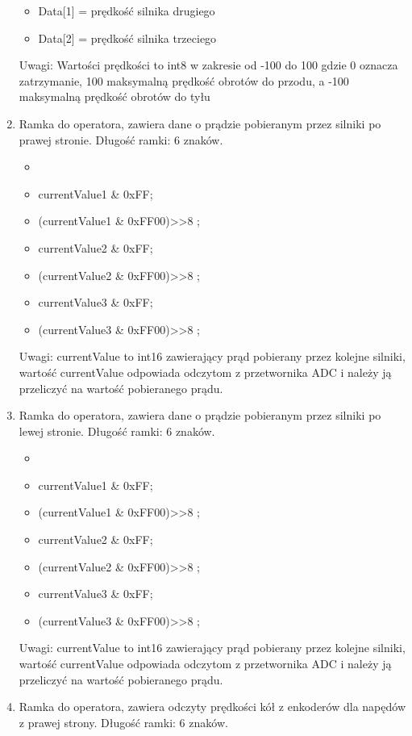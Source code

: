\documentclass{article}
\begin{document}
\begin{enumerate}
\begin{itemize}
  		\item Data[1] = prędkość silnika drugiego
  		\item Data[2] = prędkość silnika trzeciego
  		\end{itemize}
   	Uwagi: Wartości prędkości to int8 w zakresie od -100 do 100 gdzie 0 oznacza zatrzymanie, 100 maksymalną prędkość obrotów do przodu, a -100 maksymalną prędkość obrotów do tyłu
	\item Ramka do operatora, zawiera dane o prądzie pobieranym przez silniki po prawej stronie. Długość ramki: 6 znaków.
 		\begin{itemize}
 		\item {}
 	 	\item currentValue1 \& 0xFF;
  		\item (currentValue1 \& 0xFF00)>>8 ;
  		\item currentValue2 \& 0xFF;
  		\item (currentValue2 \& 0xFF00)>>8 ;
  		\item currentValue3 \& 0xFF;
  		\item (currentValue3 \& 0xFF00)>>8 ;
  		\end{itemize} 
  	Uwagi: currentValue to int16 zawierający prąd pobierany przez kolejne silniki, wartość currentValue odpowiada odczytom z przetwornika ADC i należy ją przeliczyć na wartość pobieranego prądu. 
  	\item Ramka do operatora, zawiera dane o prądzie pobieranym przez silniki po lewej stronie. Długość ramki: 6 znaków.
 		\begin{itemize}
 		\item {}
  		\item currentValue1 \& 0xFF;
  		\item (currentValue1 \& 0xFF00)>>8 ;
  		\item currentValue2 \& 0xFF;
  		\item (currentValue2 \& 0xFF00)>>8 ;
  		\item currentValue3 \& 0xFF;
  		\item (currentValue3 \& 0xFF00)>>8 ;
  		\end{itemize} 
  	Uwagi: currentValue to int16 zawierający prąd pobierany przez kolejne silniki, wartość currentValue odpowiada odczytom z przetwornika ADC i należy ją przeliczyć na wartość pobieranego prądu. 
  	\item Ramka do operatora, zawiera odczyty prędkości kół z enkoderów dla napędów z prawej strony. Długość ramki: 6 znaków. 
   	 	\begin{itemize}

\end{itemize}
\end{enumerate}
\end{document}
